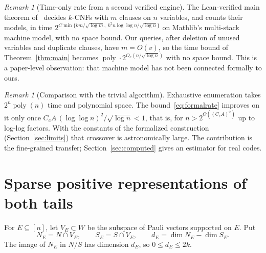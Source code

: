 \documentclass[11pt]{article}
\theoremstyle{remark}
\newtheorem{remark}[theorem]{Remark}
\newcommand{\poly}{\operatorname{poly}}
\begin{document}
\begin{remark}[Time-only rate from a second verified engine]
\label{rem:anthropic}
The Lean-verified main theorem of~\cite{anthropic2026sat} decides
\(k\)-CNFs with \(m\) clauses on \(n\) variables, and counts their
models, in time
\(2^{C\min\{km/\sqrt{\log m},\;k^2n\log\log n/\sqrt{\log n}\}}\) on
Mathlib's multi-stack machine model, with no space bound. Our queries,
after deletion of unused variables and duplicate clauses, have
\(m=O(v)\), so the time bound of Theorem~\ref{thm:main} becomes
\(\poly\cdot2^{O_c(n/\sqrt{\log n})}\) with no space bound. This is a
paper-level observation: that machine model has not been connected
formally to ours.
\end{remark}

\begin{remark}[Comparison with the trivial algorithm]\label{rem:crossover}
Exhaustive enumeration takes \(2^n\poly(n)\) time and polynomial space.
The bound~\eqref{eq:formalrate} improves on it only once
\(C_cA\,(\log\log n)^2/\sqrt{\log n}<1\), that is, for
\(n>2^{\Theta((C_cA)^2)}\) up to log-log factors. With the constants of
the formalized construction (Section~\ref{sec:limits}) that crossover is
astronomically large. The contribution is the fine-grained transfer;
Section~\ref{sec:computed} gives an estimator for real codes.
\end{remark}

\section{Sparse positive representations of both tails}
\label{sec:quantum}

For \(E\subseteq[n]\), let \(V_E\subset W\) be the subspace of Pauli
vectors supported on \(E\). Put
\[
 N_E=N\cap V_E,\qquad S_E=S\cap V_E,\qquad
 d_E=\dim N_E-\dim S_E.
\]
The image of \(N_E\) in \(N/S\) has dimension \(d_E\), so
\(0\le d_E\le2k\).
\end{document}
